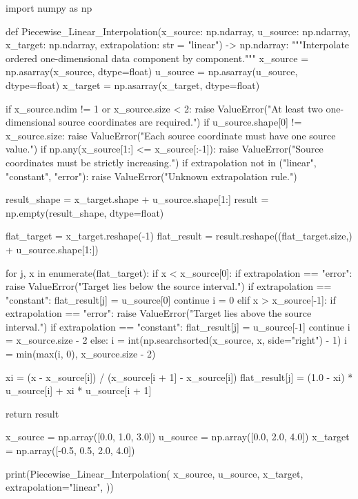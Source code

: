\begin{python}
import numpy as np


def Piecewise_Linear_Interpolation(x_source: np.ndarray,
                                   u_source: np.ndarray,
                                   x_target: np.ndarray,
                                   extrapolation: str = "linear") -> np.ndarray:
    """Interpolate ordered one-dimensional data component by component."""
    x_source = np.asarray(x_source, dtype=float)
    u_source = np.asarray(u_source, dtype=float)
    x_target = np.asarray(x_target, dtype=float)

    if x_source.ndim != 1 or x_source.size < 2:
        raise ValueError("At least two one-dimensional source coordinates are required.")
    if u_source.shape[0] != x_source.size:
        raise ValueError("Each source coordinate must have one source value.")
    if np.any(x_source[1:] <= x_source[:-1]):
        raise ValueError("Source coordinates must be strictly increasing.")
    if extrapolation not in ("linear", "constant", "error"):
        raise ValueError("Unknown extrapolation rule.")

    result_shape = x_target.shape + u_source.shape[1:]
    result = np.empty(result_shape, dtype=float)

    flat_target = x_target.reshape(-1)
    flat_result = result.reshape((flat_target.size,) + u_source.shape[1:])

    for j, x in enumerate(flat_target):
        if x < x_source[0]:
            if extrapolation == "error":
                raise ValueError("Target lies below the source interval.")
            if extrapolation == "constant":
                flat_result[j] = u_source[0]
                continue
            i = 0
        elif x > x_source[-1]:
            if extrapolation == "error":
                raise ValueError("Target lies above the source interval.")
            if extrapolation == "constant":
                flat_result[j] = u_source[-1]
                continue
            i = x_source.size - 2
        else:
            i = int(np.searchsorted(x_source, x, side="right") - 1)
            i = min(max(i, 0), x_source.size - 2)

        xi = (x - x_source[i]) / (x_source[i + 1] - x_source[i])
        flat_result[j] = (1.0 - xi) * u_source[i] + xi * u_source[i + 1]

    return result


x_source = np.array([0.0, 1.0, 3.0])
u_source = np.array([0.0, 2.0, 4.0])
x_target = np.array([-0.5, 0.5, 2.0, 4.0])

print(Piecewise_Linear_Interpolation(
    x_source,
    u_source,
    x_target,
    extrapolation="linear",
))
\end{python}

